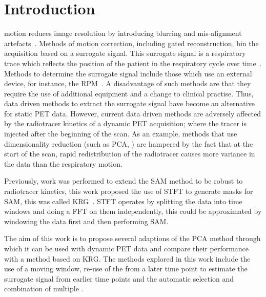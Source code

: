 \section{Introduction} \label{sec:introduction}
     motion reduces image resolution by introducing blurring and mis-alignment artefacts~\cite{Nehmeh2008a}. Methods of motion correction, including gated reconstruction, bin the acquisition based on a surrogate signal. This surrogate signal is a respiratory trace which reflects the position of the patient in the respiratory cycle over time~\cite{Kesner2010AMethods, Kesner2013GatingPET}. Methods to determine the surrogate signal include those which use an external device, for instance, the \gls{RPM}~\cite{Bettinardi2013Motion-trackingPET/CT}. A disadvantage of such methods are that they require the use of additional equipment and a change to clinical practise. Thus, data driven methods to extract the surrogate signal have become an alternative for static \acrshort{PET} data.
    However, current data driven methods are adversely affected by the radiotracer kinetics of a dynamic \acrshort{PET} acquisition; where the tracer is injected after the beginning of the scan. As an example, methods that use dimensionality reduction (such as \gls{PCA}, \cite{Thielemans2011, Bertolli2018Data-DrivenTomography}) are hampered by the fact that at the start of the scan, rapid redistribution of the radiotracer causes more variance in the data than the respiratory motion.
    
    Previously, work was performed to extend the \gls{SAM} method to be robust to radiotracer kinetics, this work proposed the use of \gls{STFT} to generate masks for \gls{SAM}, this was called \gls{KRG}~\cite{Schleyer2014}. \gls{STFT} operates by splitting the data into time windows and doing a \acrlong{FFT} on them independently, this could be approximated by windowing the data first and then performing \gls{SAM}.
    
    The aim of this work is to propose several adaptions of the \gls{PCA} method through which it can be used with dynamic \acrshort{PET} data and compare their performance with a method based on \gls{KRG}. The methods explored in this work include the use of a moving window, re-use of the  from a later time point to estimate the surrogate signal from earlier time points and the automatic selection and combination of multiple .

\vspace{-0.5cm}
    
